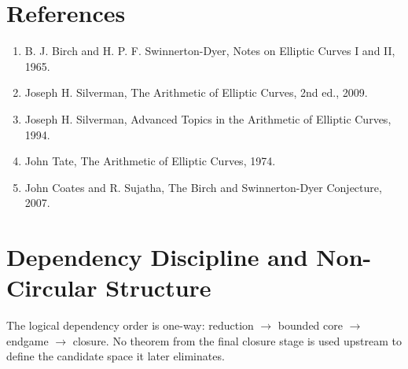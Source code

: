 \documentclass[11pt,a4paper]{article}
\begin{document}
\section{References}
\begin{enumerate}
    \item B. J. Birch and H. P. F. Swinnerton-Dyer, Notes on Elliptic Curves I and II, 1965.
    \item Joseph H. Silverman, The Arithmetic of Elliptic Curves, 2nd ed., 2009.
    \item Joseph H. Silverman, Advanced Topics in the Arithmetic of Elliptic Curves, 1994.
    \item John Tate, The Arithmetic of Elliptic Curves, 1974.
    \item John Coates and R. Sujatha, The Birch and Swinnerton-Dyer Conjecture, 2007.
\end{enumerate}

\section{Dependency Discipline and Non-Circular Structure}
The logical dependency order is one-way: reduction \(\to\) bounded core \(\to\) endgame \(\to\) closure. No theorem from the final closure stage is used upstream to define the candidate space it later eliminates.

\end{document}
